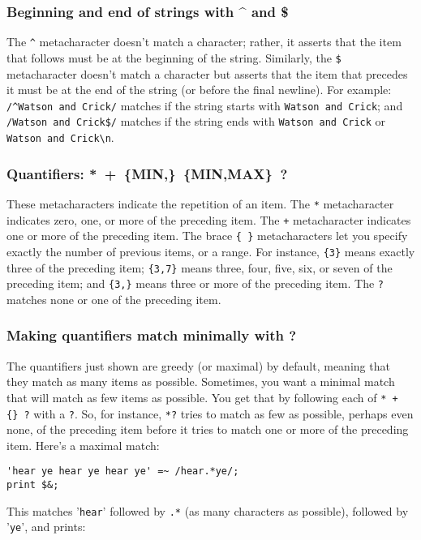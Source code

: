 \subsubsection{Beginning and end of strings with \^{} and \$}
The \verb|^| metacharacter doesn't match a character; rather, it asserts that the item that follows must be at the beginning of the string. Similarly, the \verb|$| metacharacter doesn't match a character but asserts that the item that precedes it must be at the end of the string (or before the final newline). For example: \verb|/^Watson and Crick/| matches if the string starts with \verb|Watson and Crick|; and \verb|/Watson and Crick$/| matches if the string ends with \verb|Watson and Crick| or \verb|Watson and Crick\n|.

\subsubsection{Quantifiers: *\ +\ \{MIN,\}\ \{MIN,MAX\}\ ?}
These metacharacters indicate the repetition of an item. The \verb|*| metacharacter indicates zero, one, or more of the preceding item. The \verb|+| metacharacter indicates one or more of the preceding item. The brace \verb|{ }| metacharacters let you specify exactly the number of previous items, or a range. For instance, \verb|{3}| means exactly three of the preceding item; \verb|{3,7}| means three, four, five, six, or seven of the preceding item; and \verb|{3,}| means three or more of the preceding item. The \verb|?| matches none or one of the preceding item.

\subsubsection{Making quantifiers match minimally with ?}
The quantifiers just shown are greedy (or maximal) by default, meaning that they match as many items as possible. Sometimes, you want a minimal match that will match as few items as possible. You get that by following each of \verb|* + {} ?| with a \verb|?|. So, for instance, \verb|*?| tries to match as few as possible, perhaps even none, of the preceding item before it tries to match one or more of the preceding item. Here's a maximal match:

\begin{lstlisting}
'hear ye hear ye hear ye' =~ /hear.*ye/;
print $&;
\end{lstlisting}

This matches '\verb|hear|' followed by \verb|.*| (as many characters as possible), followed by '\verb|ye|', and prints:


